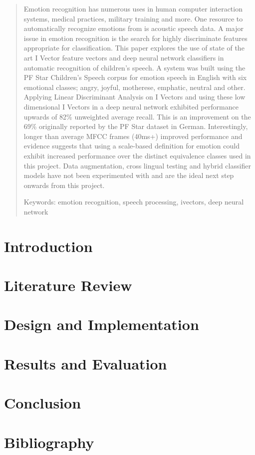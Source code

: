 \documentclass[11pt, a4paper, notitlepage]{report}
\begin{document}
\begin{titlepage}
		
		
		\begin{abstract}
			\normalsize
			Emotion recognition has numerous uses in human computer interaction systems, medical practices, military training and more. One resource to automatically recognize emotions from is acoustic speech data. A major issue in emotion recognition is the search for highly discriminate features appropriate for classification. This paper explores the use of state of the art I Vector feature vectors and deep neural network classifiers in automatic recognition of children’s speech. A system was built using the PF Star Children’s Speech corpus for emotion speech in English with six emotional classes; angry, joyful, motherese, emphatic, neutral and other. Applying Linear Discriminant Analysis on I Vectors and using these low dimensional I Vectors in a deep neural network exhibited performance upwards of 82\% unweighted average recall. This is an improvement on the 69\% originally reported by the PF Star dataset in German. Interestingly, longer than average MFCC frames (40ms+) improved performance and evidence suggests that using a scale-based definition for emotion could exhibit increased performance over the distinct equivalence classes used in this project. Data augmentation, cross lingual testing and hybrid classifier models have not been experimented with and are the ideal next step onwards from this project.
			
			Keywords: emotion recognition, speech processing, ivectors, deep neural network
		\end{abstract}
		
		\vfill %
		
	\end{titlepage}

\newpage
\tableofcontents
\newpage
	\chapter{Introduction}
	
	\chapter{Literature Review}
	
	\chapter{Design and Implementation}
	
	\chapter{Results and Evaluation}
	
	\chapter{Conclusion}
	
	\chapter{Bibliography}
	
	\appendix
	
	
\end{document}
